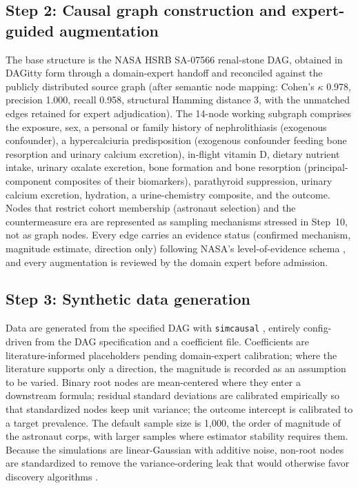 \documentclass[11pt]{article}
\begin{document}
\subsection*{Step 2: Causal graph construction and expert-guided augmentation}
The base structure is the NASA HSRB SA-07566 renal-stone DAG, obtained in
DAGitty form through a domain-expert handoff and reconciled against the
publicly distributed source graph (after semantic node mapping: Cohen's
$\kappa$ 0.978, precision 1.000, recall 0.958, structural Hamming distance
3, with the unmatched edges retained for expert adjudication). The 14-node
working subgraph comprises the exposure, sex, a personal or family history
of nephrolithiasis (exogenous confounder), a hypercalciuria predisposition
(exogenous confounder feeding bone resorption and urinary calcium
excretion), in-flight vitamin D, dietary nutrient intake, urinary oxalate
excretion, bone formation and bone resorption (principal-component
composites of their biomarkers), parathyroid suppression, urinary calcium
excretion, hydration, a urine-chemistry composite, and the outcome. Nodes
that restrict cohort membership (astronaut selection) and the
countermeasure era are represented as sampling mechanisms stressed in
Step~10, not as graph nodes. Every edge carries an evidence status
(confirmed mechanism, magnitude estimate, direction only) following NASA's
level-of-evidence schema \citep{Ward2024}, and every augmentation is
reviewed by the domain expert before admission.

\subsection*{Step 3: Synthetic data generation}
Data are generated from the specified DAG with \texttt{simcausal}
\citep{Sofrygin2017}, entirely config-driven from the DAG specification and
a coefficient file. Coefficients are literature-informed placeholders
pending domain-expert calibration; where the literature supports only a
direction, the magnitude is recorded as an assumption to be varied. Binary
root nodes are mean-centered where they enter a downstream formula;
residual standard deviations are calibrated empirically so that
standardized nodes keep unit variance; the outcome intercept is calibrated
to a target prevalence. The default sample size is 1{,}000, the order of
magnitude of the astronaut corps, with larger samples where estimator
stability requires them. Because the simulations are linear-Gaussian with
additive noise, non-root nodes are standardized to remove the
variance-ordering leak that would otherwise favor discovery algorithms
\citep{Reisach2021}.
\end{document}

